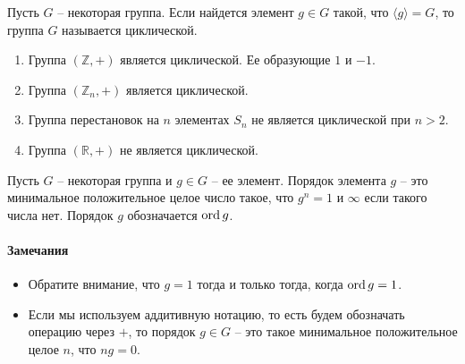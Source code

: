 \begin{definition}
Пусть $G$ -- некоторая группа.
Если найдется элемент $g\in G$ такой, что $\langle g\rangle = G$, то группа $G$ называется циклической.
\end{definition}


\begin{examples}
\begin{enumerate}
\item Группа $(\mathbb Z, +)$ является циклической.
Ее образующие $1$ и $-1$.

\item Группа $(\mathbb Z_n, +)$ является циклической.

\item Группа перестановок на $n$ элементах $S_n$ не является циклической при $n > 2$.

\item Группа $(\mathbb R, +)$ не является циклической.
\end{enumerate}
\end{examples}

\begin{definition}
Пусть $G$ -- некоторая группа и $g\in G$ -- ее элемент.
Порядок элемента $g$ -- это минимальное положительное целое число такое, что $g^n = 1$ и $\infty$ если такого числа нет.
Порядок $g$ обозначается $\operatorname{ord} g$.
\end{definition}

\paragraph{Замечания}

\begin{itemize}
\item Обратите внимание, что $g  = 1$ тогда и только тогда, когда $\operatorname{ord} g = 1$.

\item Если мы используем аддитивную нотацию, то есть будем обозначать операцию через $+$, то порядок $g\in G$ -- это такое минимальное положительное целое $n$, что $n g = 0$.
\end{itemize}
